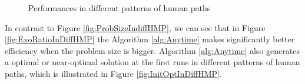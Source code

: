 \begin{figure}[H] 
  \centering 
  \caption{Performances in different patterns of human paths} 
  \label{fig:PMdiffHP} %
\end{figure}

In contrast to Figure \ref{fig:ProbSizeIndiffHMP}, we can see that in Figure \ref{fig:ExoRatioInDiffHMP} the Algorithm \ref{alg:Anytime} makes significantly better efficiency when the problem size is bigger.
Algorithm \ref{alg:Anytime} also generates a optimal or near-optimal solution at the first runs in different patterns of human paths, which is illustrated in Figure \ref{fig:InitOptInDiffHMP}. 

